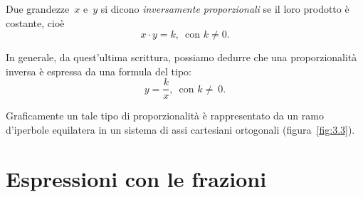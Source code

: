 \begin{definizione}
  Due grandezze~$x$ e~$y$ si dicono \emph{inversamente proporzionali} se il loro prodotto è costante,
cioè
\[x\cdot y=k\text{,~~con }k\neq 0.\]
\end{definizione}

In generale, da quest'ultima scrittura, possiamo dedurre che una proporzionalità inversa è
espressa da una formula del tipo:
\[y=\frac{k}{x}\text{,~~con }k\neq~0.\]

Graficamente un tale tipo di proporzionalità è rappresentato da un ramo d'iperbole
equilatera in un sistema di assi cartesiani ortogonali (figura~\ref{fig:3.3}).

\vspazio\ovalbox{\risolvii \ref{ese:3.127}, \ref{ese:3.128}, \ref{ese:3.129}, \ref{ese:3.130}}

\pagebreak

\section{Espressioni con le frazioni}


